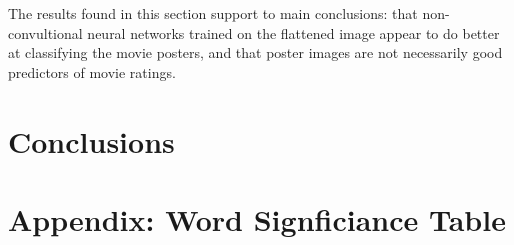 \documentclass[12pt, oneside]{article}   	%
\begin{document}
The results found in this section support to main conclusions: that non-convultional neural networks trained on the flattened image appear to do better at classifying the movie posters, and that poster images are not necessarily good predictors of movie ratings.

\section{Conclusions}



\newpage



\newpage

\appendix
\section{Appendix: Word Signficiance Table}
\label{appendix:word_signif_table}
\end{document}

